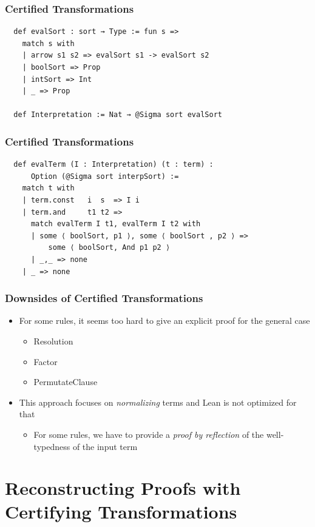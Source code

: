 \documentclass[usepdftitle=false,aspectratio=169,usenames,dvipsnames]{beamer}
\newcommand\vitem{\vfill\item}
\begin{document}
\begin{frame}[fragile]
  \frametitle{Certified Transformations}
  \begin{verbatim}
  def evalSort : sort → Type := fun s =>
    match s with
    | arrow s1 s2 => evalSort s1 -> evalSort s2
    | boolSort => Prop
    | intSort => Int
    | _ => Prop

  def Interpretation := Nat → @Sigma sort evalSort
  \end{verbatim}
\end{frame}

\begin{frame}[fragile]
  \frametitle{Certified Transformations}
  \begin{verbatim}
  def evalTerm (I : Interpretation) (t : term) :
      Option (@Sigma sort interpSort) :=
    match t with
    | term.const   i  s  => I i
    | term.and     t1 t2 =>
      match evalTerm I t1, evalTerm I t2 with
      | some ⟨ boolSort, p1 ⟩, some ⟨ boolSort , p2 ⟩ =>
          some ⟨ boolSort, And p1 p2 ⟩
      | _,_ => none
    | _ => none
    \end{verbatim}
\end{frame}

\begin{frame}
  \frametitle{Downsides of Certified Transformations}
  \begin{itemize}
    \item For some rules, it seems too hard to give an explicit proof for the general case
    \begin{itemize}
      \item Resolution
      \item Factor
      \item PermutateClause
    \end{itemize}
    \vitem This approach focuses on \textit{normalizing} terms and Lean is not optimized for that
    \begin{itemize}
      \item For some rules, we have to provide a \textit{proof by reflection} of the well-typedness of the input term
    \end{itemize}
  \end{itemize}
\end{frame}

\section{Reconstructing Proofs with Certifying Transformations}
\end{document}
